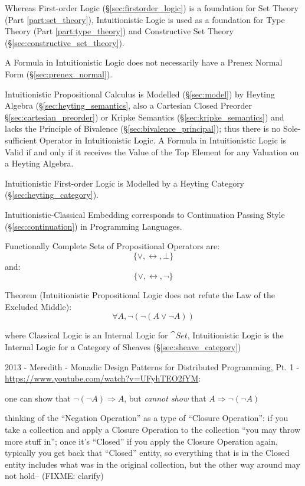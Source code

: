 Whereas First-order Logic (\S\ref{sec:firstorder_logic}) is a
foundation for Set Theory (Part \ref{part:set_theory}), Intuitionistic
Logic is used as a foundation for Type Theory (Part
\ref{part:type_theory}) and Constructive Set Theory
(\S\ref{sec:constructive_set_theory}).

A Formula in Intuitionistic Logic does not necessarily have a Prenex
Normal Form (\S\ref{sec:prenex_normal}).

Intuitionistic Propositional Calculus is Modelled (\S\ref{sec:model})
by Heyting Algebra (\S\ref{sec:heyting_semantics}, also a Cartesian
Closed Preorder \S\ref{sec:cartesian_preorder}) or Kripke Semantics
(\S\ref{sec:kripke_semantics}) and lacks the Principle of Bivalence
(\S\ref{sec:bivalence_principal}); thus there is no Sole-sufficient
Operator in Intuitionistic Logic. A Formula in Intuitionistic Logic is
Valid if and only if it receives the Value of the Top Element for any
Valuation on a Heyting Algebra.

Intuitionistic First-order Logic is Modelled by a Heyting Category
(\S\ref{sec:heyting_category}).

Intuitionistic-Classical Embedding corresponds to Continuation Passing
Style (\S\ref{sec:continuation}) in Programming Languages.

Functionally Complete Sets of Propositional Operators are:
\[
  \{ \vee, \leftrightarrow, \bot \}
\]
and:
\[
  \{ \vee, \leftrightarrow, \neg \}
\]

Theorem (Intuitionistic Propositional Logic does not refute the Law of
the Excluded Middle)\cite{harper12}:
\[
  \forall A, \neg (\neg (A \vee \neg A))
\]

where Classical Logic is an Internal Logic for $\cat{Set}$, Intuitionistic Logic
is the Internal Logic for a Category of Sheaves (\S\ref{sec:sheave_category})

2013 - Meredith - Monadic Design Patterns for Distributed Programming, Pt. 1 -
\url{https://www.youtube.com/watch?v=UFyhTEO2fYM}:

one can show that $\neg(\neg A) \Rightarrow A$, but \emph{cannot show} that
$A \Rightarrow \neg(\neg A)$

thinking of the ``Negation Operation'' as a type of ``Closure Operation'': if
you take a collection and apply a Closure Operation to the collection ``you may
throw more stuff in''; once it's ``Closed'' if you apply the Closure Operation
again, typically you get back that ``Closed'' entity, so everything that is in
the Closed entity includes what was in the original collection, but the other
way around may not hold-- (FIXME: clarify)

